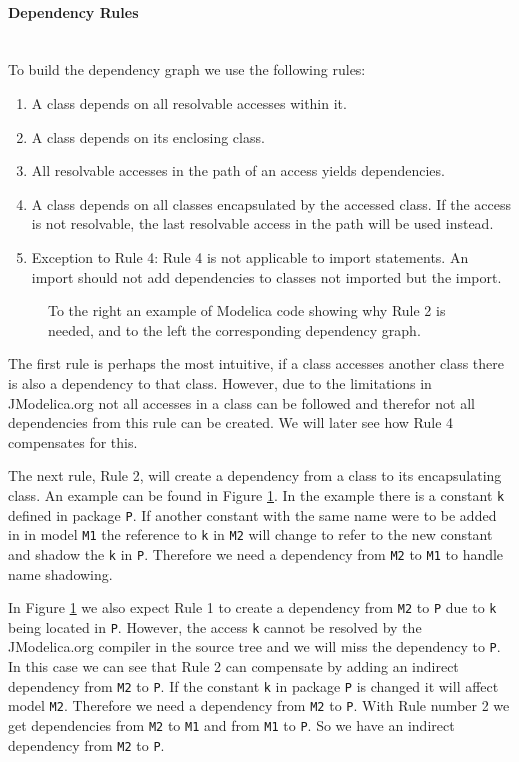 \documentclass{cslthse-msc}
\begin{document}
\paragraph{Dependency Rules}\mbox{}\\
To build the dependency graph we use the following rules:
\begin{enumerate}
\item A class depends on all resolvable accesses within it.
\item A class depends on its enclosing class. 
\item All resolvable accesses in the path of an access yields dependencies.
\item A class depends on all classes encapsulated by the accessed class. If the access is not resolvable, the last resolvable access in the path will be used instead.
\item Exception to Rule 4: Rule 4 is not applicable to import statements. An import should not add dependencies to classes not imported but the import.
\end{enumerate}


\begin{figure}[!htbp]
    \centering
    \qquad
    \subfloat{\raisebox{3.2 cm}{}}
    \caption{To the right an example of Modelica code showing why Rule 2 is needed, and to the left the corresponding dependency graph.}
    \label{fig:parentGraph}
\end{figure}

The first rule is perhaps the most intuitive, if a class accesses another class there is also a dependency to that class. However, due to the limitations in JModelica.org not all accesses in a class can be followed and therefor not all dependencies from this rule can be created. We will later see how Rule 4 compensates for this. 

The next rule, Rule 2, will create a dependency from a class to its encapsulating class. An example can be found in Figure \ref{fig:parentGraph}. In the example there is a constant \texttt{k} defined in package \texttt{P}. If another constant with the same name were to be added in in model \texttt{M1} the reference to \texttt{k} in \texttt{M2} will change to refer to the new constant and shadow the \texttt{k} in \texttt{P}. Therefore we need a dependency from \texttt{M2} to \texttt{M1} to handle name shadowing.

In Figure \ref{fig:parentGraph} we also expect Rule 1 to create a dependency from \texttt{M2} to \texttt{P} due to \texttt{k} being located in \texttt{P}. However, the access \texttt{k} cannot be resolved by the JModelica.org compiler in the source tree and we will miss the dependency to \texttt{P}. In this case we can see that Rule 2 can compensate by adding an indirect dependency from \texttt{M2} to \texttt{P}. 
If the constant \texttt{k} in package \texttt{P} is changed it will affect model \texttt{M2}. Therefore we need a dependency from \texttt{M2} to \texttt{P}. With Rule number 2 we get dependencies from \texttt{M2} to \texttt{M1} and from \texttt{M1} to \texttt{P}. So we have an indirect dependency from \texttt{M2} to \texttt{P}.
\end{document}
